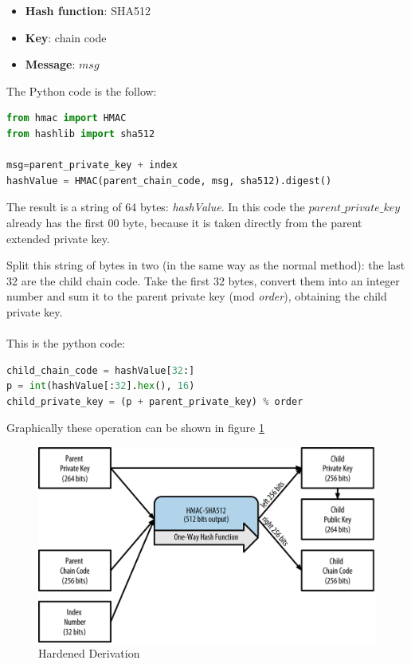 \begin{itemize}[label=$\odot$]
	\item \textbf{Hash function}: SHA512
	\item \textbf{Key}: chain code
	\item \textbf{Message}: $msg$
\end{itemize}
The Python code is the follow:
\begin{lstlisting}[language=Python]
from hmac import HMAC
from hashlib import sha512

msg=parent_private_key + index
hashValue = HMAC(parent_chain_code, msg, sha512).digest()
\end{lstlisting}
\begin{flushleft}
	The result is a string of 64 bytes: \textit{hashValue}. In this code the $parent\_private\_key$ already has the first $00$ byte, because it is taken directly from the parent extended private key.
\end{flushleft}
Split this string of bytes in two (in the same way as the normal method): the last 32 are the child chain code. Take the first 32 bytes, convert them into an integer number and sum it to the parent private key (mod \textit{order}), obtaining the child private key.\\ \\
This is the python code:

\begin{lstlisting}[language=Python]
child_chain_code = hashValue[32:]
p = int(hashValue[:32].hex(), 16)
child_private_key = (p + parent_private_key) % order
\end{lstlisting}


\begin{flushleft}
	Graphically these operation can be shown in figure \ref{fig:hardened_derivation}
\end{flushleft}

\begin{figure}[ht!]
	\centering
	\includegraphics[width=15cm]{Figures/hardened_derivation.png}
	\caption{Hardened Derivation }
	\label{fig:hardened_derivation}
\end{figure}